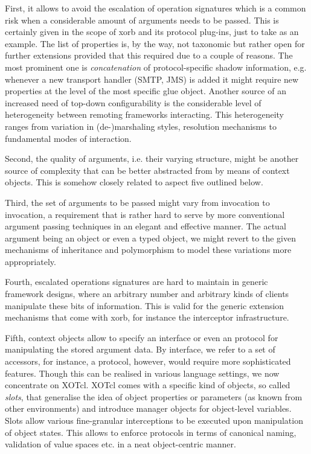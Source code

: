 First, it allows to avoid the escalation of operation signatures which is a common risk when a considerable amount of arguments needs to be passed. This is certainly given in the scope of xorb and its protocol plug-ins, just to take  as an example. The list of properties is, by the way, not taxonomic but rather open for further extensions provided that this required due to a couple of reasons. The most prominent one is \emph{concatenation} of protocol-specific shadow information, e.g. whenever a new transport handler (SMTP, JMS) is added it might require new properties at the level of the most specific glue object. Another source of an increased need of top-down configurability is the considerable level of heterogeneity between remoting frameworks interacting. This heterogeneity ranges from variation in (de-)marshaling styles, resolution mechanisms to fundamental modes of interaction.

Second, the quality of arguments, i.e. their varying structure, might be another source of complexity that can be better abstracted from by means of context objects. This is somehow closely related to aspect five outlined below.

Third, the set of arguments to be passed might vary from invocation to invocation, a requirement that is rather hard to serve by more conventional argument passing techniques in an elegant and effective manner. The actual argument being an object or even a typed object, we might revert to the given mechanisms of inheritance and polymorphism to model these variations more appropriately.

Fourth, escalated operations signatures are hard to maintain in generic framework designs, where an arbitrary number and arbitrary kinds of clients manipulate these bits of information. This is valid for the generic extension mechanisms that come with xorb, for instance the interceptor infrastructure.

Fifth, context objects allow to specify an interface or even an protocol for manipulating the stored argument data. By interface, we refer to a set of accessors, for instance, a protocol, however, would require more sophisticated features. Though this can be realised in various language settings, we now concentrate on XOTcl. XOTcl comes with a specific kind of objects, so called \emph{slots}, that generalise the idea of object properties or parameters (as known from other environments) and introduce manager objects for object-level variables. Slots allow various fine-granular interceptions to be executed upon manipulation of object states. This allows to enforce protocols in terms of canonical naming, validation of value spaces etc. in a neat object-centric manner.

